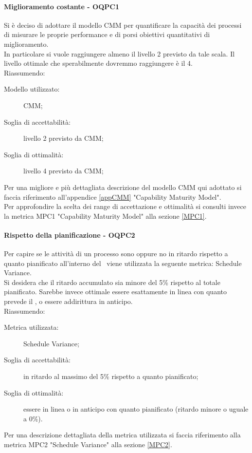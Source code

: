 \documentclass[../PianoDiQualifica.tex]{subfiles}
\begin{document}
		\paragraph{Miglioramento costante - OQPC1}
		Si è deciso di adottare il modello CMM per quantificare la capacità dei processi di misurare le proprie performance e di porsi obiettivi quantitativi di miglioramento.\\
		In particolare si vuole raggiungere almeno il livello 2 previsto da tale scala. Il livello ottimale che sperabilmente dovremmo raggiungere è il 4.\\
		Riassumendo:
		\begin{description}
			\item[Modello utilizzato:] CMM;
			\item[Soglia di accettabilità:] livello 2 previsto da CMM;
			\item[Soglia di ottimalità:] livello 4 previsto da CMM;
		\end{description}
		Per una migliore e più dettagliata descrizione del modello CMM qui adottato si faccia riferimento all'appendice \ref{appCMM} "Capability Maturity Model".\\
		Per approfondire la scelta dei range di accettazione e ottimalità si consulti invece la metrica MPC1 "Capability Maturity Model" alla sezione \ref{MPC1}.
		
		\paragraph{Rispetto della pianificazione - OQPC2}
		Per capire se le attività di un processo sono oppure no in ritardo rispetto a quanto pianificato all’interno del \pianodiprogetto\ viene utilizzata la seguente metrica: Schedule Variance.\\
		Si desidera che il ritardo accumulato sia minore del 5\% rispetto al totale pianificato. Sarebbe invece ottimale essere esattamente in linea con quanto prevede il \pianodiprogetto, o essere addirittura in anticipo.\\
		Riassumendo:
		\begin{description}
			\item[Metrica utilizzata:] Schedule Variance;
			\item[Soglia di accettabilità:] in ritardo al massimo del 5\% rispetto a quanto pianificato;
			\item[Soglia di ottimalità:] essere in linea o in anticipo con quanto pianificato (ritardo minore o uguale a 0\%).
		\end{description}
		Per una descrizione dettagliata della metrica utilizzata si faccia riferimento alla metrica MPC2 "Schedule Variance" alla sezione \ref{MPC2}.
		
\end{document}
